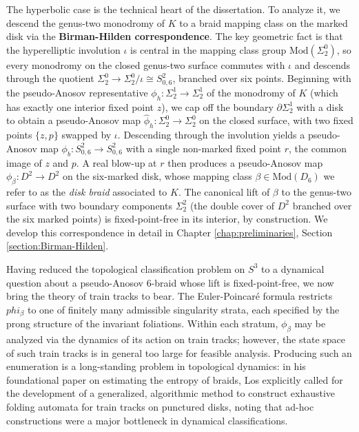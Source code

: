 The hyperbolic case is the technical heart of the dissertation. To analyze it, we descend the genus-two monodromy of $K$ to a braid mapping class on the marked disk via the \textbf{Birman-Hilden correspondence}. The key geometric fact is that the hyperelliptic involution $\iota$ is central in the mapping class group $\mathrm{Mod}(\Sigma_2^0)$, so every monodromy on the closed genus-two surface commutes with $\iota$ and descends through the quotient $\Sigma_2^0 \to \Sigma_2^0/\iota \cong S^2_{0,6}$, branched over six points. Beginning with the pseudo-Anosov representative $\phi_h \colon \Sigma_2^1 \to \Sigma_2^1$ of the monodromy of $K$ (which has exactly one interior fixed point $z$), we cap off the boundary $\partial \Sigma_2^1$ with a disk to obtain a pseudo-Anosov map $\hat{\phi}_h \colon \Sigma_2^0 \to \Sigma_2^0$ on the closed surface, with two fixed points $\{z, p\}$ swapped by $\iota$. Descending through the involution yields a pseudo-Anosov map $\phi_b \colon S^2_{0,6} \to S^2_{0,6}$ with a single non-marked fixed point $r$, the common image of $z$ and $p$. A real blow-up at $r$ then produces a pseudo-Anosov map $\phi_\beta \colon D^2 \to D^2$ on the six-marked disk, whose mapping class $\beta \in \mathrm{Mod}(D_6)$ we refer to as the \emph{disk braid} associated to $K$. The canonical lift of $\beta$ to the genus-two surface with two boundary components $\Sigma_2^2$ (the double cover of $D^2$ branched over the six marked points) is fixed-point-free in its interior, by construction. We develop this correspondence in detail in Chapter \ref{chap:preliminaries}, Section \ref{section:Birman-Hilden}.

Having reduced the topological classification problem on $S^3$ to a dynamical question about a pseudo-Anosov 6-braid whose lift is fixed-point-free, we now bring the theory of train tracks to bear. The Euler-Poincar\'{e} formula restricts $phi_\beta$ to one of finitely many admissible singularity strata, each specified by the prong structure of the invariant foliations. Within each stratum, $\phi_\beta$ may be analyzed via the dynamics of its action on train tracks; however, the state space of such train tracks is in general too large for feasible analysis. Producing such an enumeration is a long-standing problem in topological dynamics: in his foundational paper on estimating the entropy of braids, Los \cite{LosAlgorithm} explicitly called for the development of a generalized, algorithmic method to construct exhaustive folding automata for train tracks on punctured disks, noting that ad-hoc constructions were a major bottleneck in dynamical classifications.

